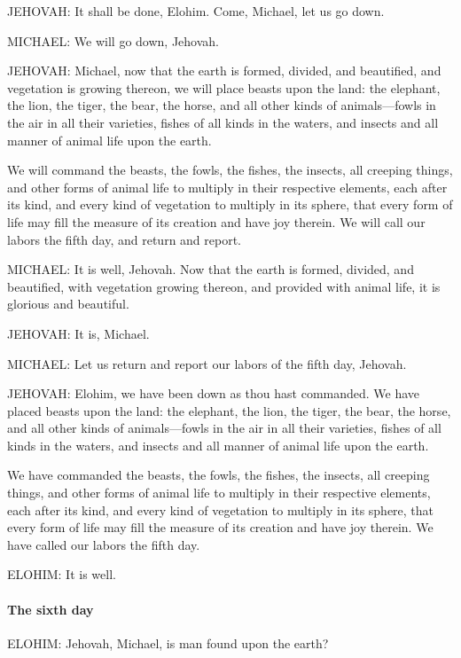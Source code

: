 				JEHOVAH: It shall be done, Elohim. Come, Michael, let us go down.

				MICHAEL: We will go down, Jehovah.

				JEHOVAH: Michael, now that the earth is formed, divided, and beautified, and vegetation is growing thereon, we will place beasts upon the land: the elephant, the lion, the tiger, the bear, the horse, and all other kinds of animals---fowls in the air in all their varieties, fishes of all kinds in the waters, and insects and all manner of animal life upon the earth.

				We will command the beasts, the fowls, the fishes, the insects, all creeping things, and other forms of animal life to multiply in their respective elements, each after its kind, and every kind of vegetation to multiply in its sphere, that every form of life may fill the measure of its creation and have joy therein. We will call our labors the fifth day, and return and report.

				MICHAEL: It is well, Jehovah. Now that the earth is formed, divided, and beautified, with vegetation growing thereon, and provided with animal life, it is glorious and beautiful.

				JEHOVAH: It is, Michael.

				MICHAEL: Let us return and report our labors of the fifth day, Jehovah.

				JEHOVAH: Elohim, we have been down as thou hast commanded. We have placed beasts upon the land: the elephant, the lion, the tiger, the bear, the horse, and all other kinds of animals---fowls in the air in all their varieties, fishes of all kinds in the waters, and insects and all manner of animal life upon the earth.

				We have commanded the beasts, the fowls, the fishes, the insects, all creeping things, and other forms of animal life to multiply in their respective elements, each after its kind, and every kind of vegetation to multiply in its sphere, that every form of life may fill the measure of its creation and have joy therein. We have called our labors the fifth day.

				ELOHIM: It is well.
				
			\paragraph{The sixth day}
				\label{TEMPLE-ENDOWMENT-ENDOW-PRE-1990-DAY6}
				
				ELOHIM: Jehovah, Michael, is man found upon the earth?

